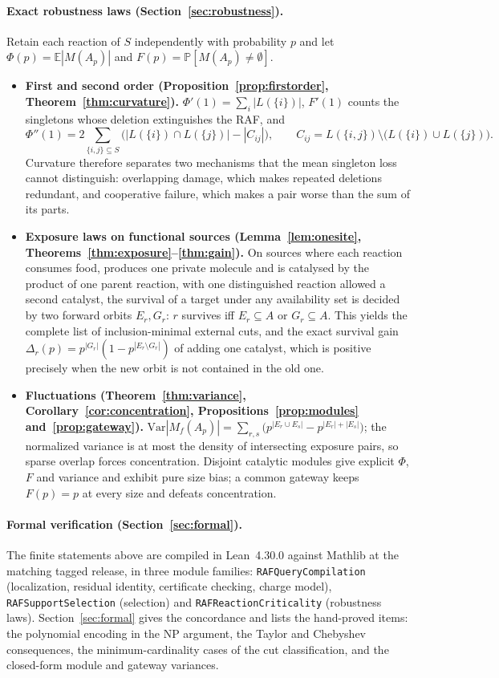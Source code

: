 \documentclass[11pt,a4paper]{article}
\theoremstyle{plain}
\theoremstyle{definition}
\theoremstyle{remark}
\newcommand{\E}{\mathbb{E}}
\renewcommand{\Pr}{\mathbb{P}}
\newcommand{\Var}{\mathrm{Var}}
\newcommand{\lean}[1]{\texttt{#1}}
\begin{document}
\paragraph{Exact robustness laws (Section~\ref{sec:robustness}).}
Retain each reaction of $S$ independently with probability $p$ and let $\Phi(p)=\E|M(A_p)|$ and $F(p)=\Pr[M(A_p)\neq\emptyset]$.
\begin{itemize}
\item \textbf{First and second order (Proposition~\ref{prop:firstorder}, Theorem~\ref{thm:curvature}).} $\Phi'(1)=\sum_i|L(\{i\})|$, $F'(1)$ counts the singletons whose deletion extinguishes the RAF, and
\[
\Phi''(1)=2\sum_{\{i,j\}\subseteq S}\Big(|L(\{i\})\cap L(\{j\})|-|C_{ij}|\Big),\qquad C_{ij}=L(\{i,j\})\setminus\big(L(\{i\})\cup L(\{j\})\big).
\]
Curvature therefore separates two mechanisms that the mean singleton loss cannot distinguish: overlapping damage, which makes repeated deletions redundant, and cooperative failure, which makes a pair worse than the sum of its parts.
\item \textbf{Exposure laws on functional sources (Lemma~\ref{lem:onesite}, Theorems~\ref{thm:exposure}--\ref{thm:gain}).} On sources where each reaction consumes food, produces one private molecule and is catalysed by the product of one parent reaction, with one distinguished reaction allowed a second catalyst, the survival of a target under any availability set is decided by two forward orbits $E_r,G_r$: $r$ survives iff $E_r\subseteq A$ or $G_r\subseteq A$. This yields the complete list of inclusion-minimal external cuts, and the exact survival gain $\Delta_r(p)=p^{|G_r|}(1-p^{|E_r\setminus G_r|})$ of adding one catalyst, which is positive precisely when the new orbit is not contained in the old one.
\item \textbf{Fluctuations (Theorem~\ref{thm:variance}, Corollary~\ref{cor:concentration}, Propositions~\ref{prop:modules} and~\ref{prop:gateway}).} $\Var|M_f(A_p)|=\sum_{r,s}\big(p^{|E_r\cup E_s|}-p^{|E_r|+|E_s|}\big)$; the normalized variance is at most the density of intersecting exposure pairs, so sparse overlap forces concentration. Disjoint catalytic modules give explicit $\Phi$, $F$ and variance and exhibit pure size bias; a common gateway keeps $F(p)=p$ at every size and defeats concentration.
\end{itemize}

\paragraph{Formal verification (Section~\ref{sec:formal}).}
The finite statements above are compiled in Lean~4.30.0 against Mathlib at the matching tagged release, in three module families: \lean{RAFQueryCompilation} (localization, residual identity, certificate checking, charge model), \lean{RAFSupportSelection} (selection) and \lean{RAFReactionCriticality} (robustness laws). Section~\ref{sec:formal} gives the concordance and lists the hand-proved items: the polynomial encoding in the NP argument, the Taylor and Chebyshev consequences, the minimum-cardinality cases of the cut classification, and the closed-form module and gateway variances.
\end{document}
